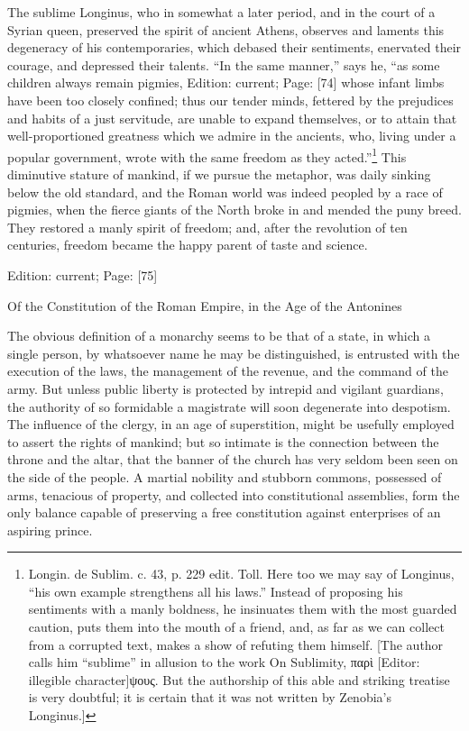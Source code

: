 The sublime Longinus, who in somewhat a later period, and in the court of a Syrian queen, preserved the spirit of ancient Athens, observes and laments this degeneracy of his contemporaries, which debased their sentiments, enervated their courage, and depressed their talents. \texthebrew{“}In the same manner,\texthebrew{}” says he, \texthebrew{“}as some children always remain pigmies, Edition: current; Page: [74] whose infant limbs have been too closely confined; thus our tender minds, fettered by the prejudices and habits of a just servitude, are unable to expand themselves, or to attain that well-proportioned greatness which we admire in the ancients, who, living under a popular government, wrote with the same freedom as they acted.\texthebrew{}”\footnote{Longin. de Sublim. c. 43, p. 229 edit. Toll. Here too we may say of Longinus, \texthebrew{“}his own example strengthens all his laws.\texthebrew{}” Instead of proposing his sentiments with a manly boldness, he insinuates them with the most guarded caution, puts them into the mouth of a friend, and, as far as we can collect from a corrupted text, makes a show of refuting them himself. [The author calls him \texthebrew{“}sublime\texthebrew{}” in allusion to the work On Sublimity, \textgreek{παρ\texthebrew{ὶ}} [Editor: illegible character]\textgreek{ψους}. But the authorship of this able and striking treatise is very doubtful; it is certain that it was not written by Zenobia\texthebrew{}’s Longinus.]} This diminutive stature of mankind, if we pursue the metaphor, was daily sinking below the old standard, and the Roman world was indeed peopled by a race of pigmies, when the fierce giants of the North broke in and mended the puny breed. They restored a manly spirit of freedom; and, after the revolution of ten centuries, freedom became the happy parent of taste and science.

Edition: current; Page: [75]


Of the Constitution of the Roman Empire, in the Age of the Antonines

The obvious definition of a monarchy seems to be that of a state, in which a single person, by whatsoever name he may be distinguished, is entrusted with the execution of the laws, the management of the revenue, and the command of the army. But unless public liberty is protected by intrepid and vigilant guardians, the authority of so formidable a magistrate will soon degenerate into despotism. The influence of the clergy, in an age of superstition, might be usefully employed to assert the rights of mankind; but so intimate is the connection between the throne and the altar, that the banner of the church has very seldom been seen on the side of the people. A martial nobility and stubborn commons, possessed of arms, tenacious of property, and collected into constitutional assemblies, form the only balance capable of preserving a free constitution against enterprises of an aspiring prince.

